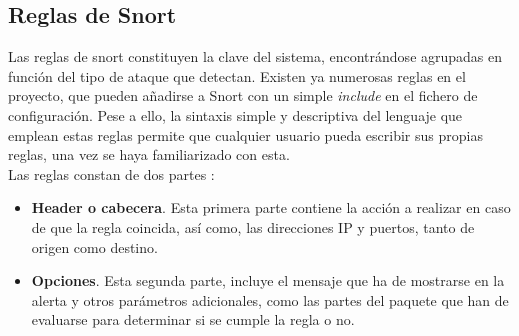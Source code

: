 \subsection{Reglas de Snort}
Las reglas de snort constituyen la clave del sistema, encontrándose agrupadas en función del tipo de ataque que detectan. Existen ya numerosas reglas en el proyecto, que pueden añadirse a Snort con un simple \textit{include} en el fichero de configuración. Pese a ello, la sintaxis simple y descriptiva del lenguaje que emplean estas reglas permite que cualquier usuario pueda escribir sus propias reglas, una vez se haya familiarizado con esta.\\
Las reglas constan de dos partes \cite{snortman}:
\begin{itemize}
	\item \textbf{Header o cabecera}. Esta primera parte contiene la acción a realizar en caso de que la regla coincida, así como, las direcciones IP y puertos, tanto de origen como destino.
	\item \textbf{Opciones}. Esta segunda parte, incluye el mensaje que ha de mostrarse en la alerta y otros parámetros adicionales, como las partes del paquete que han de evaluarse para determinar si se cumple la regla o no.
\end{itemize}
